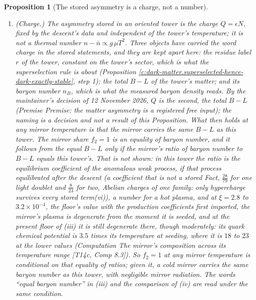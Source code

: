 \documentclass[11pt]{article}
\newtheorem{proposition}[theorem]{Proposition}
\theoremstyle{definition}
\theoremstyle{plain}
\begin{document}
\begin{proposition}[The stored asymmetry is a charge, not a number]
\begin{enumerate}
\item[(i)] \emph{(Charge.)} The asymmetry stored in an oriented tower is the charge $Q = \epsilon N$, fixed by the descent's data and independent of the tower's temperature; it is not a thermal number $n - \bar{n} \propto g\,\mu T^{2}$. Three objects have carried the word charge in the stored statements, and they are kept apart here: the residue label $r$ of the tower, constant on the tower's sector, which is what the superselection rule is about (Proposition \ref{c:dark-matter.superselected-hence-dark-exactly-stable}, step 1); the total $B - L$ of the tower's matter; and its baryon number $n_{B}$, which is what the measured baryon density reads. By the maintainer's decision of 12 November 2026, $Q$ is the second, the total $B - L$ (Premise \emph{Premise: the matter asymmetry is a registered free input}); the naming is a decision and not a result of this Proposition. What then holds at any mirror temperature is that the mirror carries the same $B - L$ as this tower. The mirror share $f_{2} = 1$ is an equality of baryon number, and it follows from the equal $B - L$ only if the mirror's ratio of baryon number to $B - L$ equals this tower's. That is not shown: in this tower the ratio is the equilibrium coefficient of the anomalous weak process, if that process equilibrated after the descent (a coefficient that is not a stored Fact, $\tfrac{28}{79}$ for one light doublet and $\tfrac{8}{23}$ for two, \emph{Abelian charges of one family: only hypercharge survives every stored term}(vi)), a number for a hot plasma, and at $\xi = 2.8$ to $3.2 \times 10^{-4}$, the floor's value with the production coefficients first imported, the mirror's plasma is degenerate from the moment it is seeded, and at the present floor of (iii) it is still degenerate there, though moderately: its quark chemical potential is $3.5$ times its temperature at seeding, where it is $18$ to $23$ at the lower values (Computation \emph{The mirror's composition across its temperature range} [T14c, Comp 8.3]). So $f_{2} = 1$ at any mirror temperature is conditional on that equality of ratios; given it, a cold mirror carries the same baryon number as this tower, with negligible mirror radiation. The words ``equal baryon number'' in (iii) and the comparison of (iv) are read under the same condition.

\end{enumerate}
\end{proposition}
\end{document}
